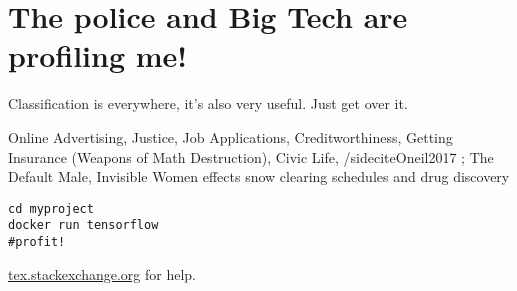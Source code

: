 \setchapterpreamble[u]{\margintoc}
\chapter{The police and Big Tech are profiling me!}

Classification is everywhere, it's also very useful. Just get over it. 

Online Advertising, Justice, Job Applications, Creditworthiness, Getting Insurance (Weapons of Math Destruction), Civic Life, /sidecite{Oneil2017} ; The Default Male, Invisible Women effects snow clearing schedules and drug discovery 

\begin{lstlisting}[style=kaolstplain,linewidth=1.5\textwidth]
cd myproject
docker run tensorflow
#profit!
\end{lstlisting}

\url{tex.stackexchange.org} for help.
